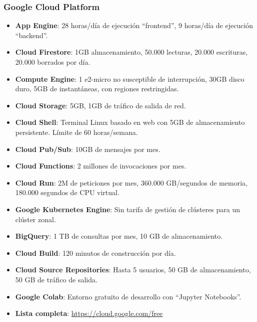 \subsubsection*{Google Cloud Platform}
\begin{itemize}
	\item \textbf{App Engine}: 28 horas/día de ejecución ``frontend'', 9 horas/día de ejecución ``backend''.
	\item \textbf{Cloud Firestore}: 1GB almacenamiento, 50.000 lecturas, 20.000 escrituras, 20.000 borrados por día.
	\item \textbf{Compute Engine}: 1 e2-micro no susceptible de interrupción, 30GB disco duro, 5GB de instantáneas, con regiones restringidas.
	\item \textbf{Cloud Storage}: 5GB, 1GB de tráfico de salida de red.
	\item \textbf{Cloud Shell}: Terminal Linux basado en web con 5GB de almacenamiento persistente. Límite de 60 horas/semana.
	\item \textbf{Cloud Pub/Sub}: 10GB de mensajes por mes.
	\item \textbf{Cloud Functions}: 2 millones de invocaciones por mes.
	\item \textbf{Cloud Run}: 2M de peticiones por mes, 360.000 GB/segundos de memoria, 180.000 segundos de CPU virtual.
	\item \textbf{Google Kubernetes Engine}: Sin tarifa de gestión de clústeres para un clúster zonal.
	\item \textbf{BigQuery}: 1 TB de consultas por mes, 10 GB de almacenamiento.
	\item \textbf{Cloud Build}: 120 minutos de construcción por día.
	\item \textbf{Cloud Source Repositories}: Hasta 5 usuarios, 50 GB de almacenamiento, 50 GB de tráfico de salida.
	\item \textbf{Google Colab}: Entorno gratuito de desarrollo con ``Jupyter Notebooks''.
	\item \textbf{Lista completa}: \url{https://cloud.google.com/free}
\end{itemize}

